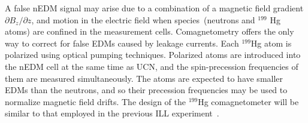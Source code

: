 A false nEDM signal may arise due to a combination of a magnetic field
gradient $\partial {B_z}/\partial z$, and motion in the electric field
when species~(neutrons and $^{199}$ Hg atoms) are confined in the
measurement cells. Comagnetometry offers the only way to correct for
false EDMs caused by leakage currents.  Each $^{199}$Hg atom is
polarized using optical pumping techniques. Polarized atoms are
introduced into the nEDM cell at the same time as UCN, and the
spin-precession frequencies of them are measured simultaneously. The
atoms are expected to have smaller EDMs than the neutrons, and so
their precession frequencies may be used to normalize magnetic field
drifts.  The design of the $^{199}$Hg comagnetometer will be similar
to that employed in the previous ILL
experiment~\cite{Baker2006,Griffith2009}.










